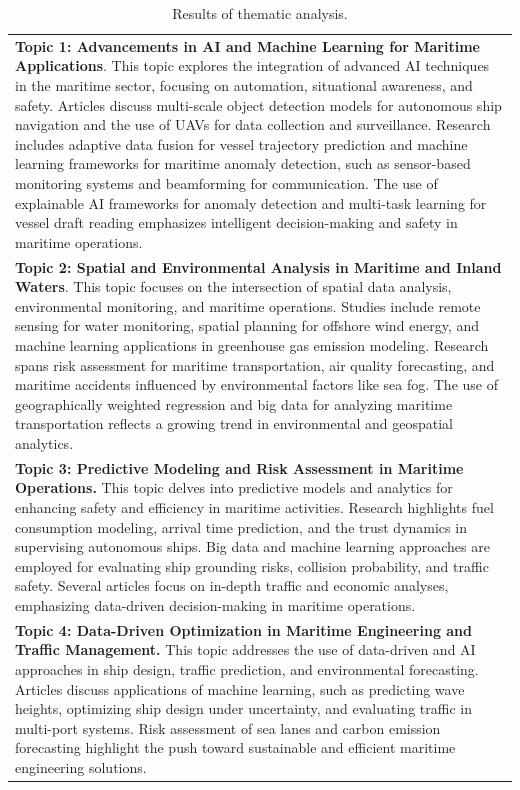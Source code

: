 \documentclass[a4paper, review, endfloat, authoryear]{elsarticle}
\begin{document}
	\begin{table}[h]
		\centering
		\caption{Results of thematic analysis.}
		\begin{tabular}{l}
			\hline
			\textbf{Topic 1: Advancements in AI and Machine Learning for Maritime Applications}. This topic explores the integration of advanced AI techniques in the maritime sector, focusing on automation, situational awareness, and safety. Articles discuss multi-scale object detection models for autonomous ship navigation and the use of UAVs for data collection and surveillance. Research includes adaptive data fusion for vessel trajectory prediction and machine learning frameworks for maritime anomaly detection, such as sensor-based monitoring systems and beamforming for communication. The use of explainable AI frameworks for anomaly detection and multi-task learning for vessel draft reading emphasizes intelligent decision-making and safety in maritime operations.\\			
			\textbf{Topic 2: Spatial and Environmental Analysis in Maritime and Inland Waters}. This topic focuses on the intersection of spatial data analysis, environmental monitoring, and maritime operations. Studies include remote sensing for water monitoring, spatial planning for offshore wind energy, and machine learning applications in greenhouse gas emission modeling. Research spans risk assessment for maritime transportation, air quality forecasting, and maritime accidents influenced by environmental factors like sea fog. The use of geographically weighted regression and big data for analyzing maritime transportation reflects a growing trend in environmental and geospatial analytics.\\			
			\textbf{Topic 3: Predictive Modeling and Risk Assessment in Maritime Operations.} This topic delves into predictive models and analytics for enhancing safety and efficiency in maritime activities. Research highlights fuel consumption modeling, arrival time prediction, and the trust dynamics in supervising autonomous ships. Big data and machine learning approaches are employed for evaluating ship grounding risks, collision probability, and traffic safety. Several articles focus on in-depth traffic and economic analyses, emphasizing data-driven decision-making in maritime operations.\\			
			\textbf{Topic 4: Data-Driven Optimization in Maritime Engineering and Traffic Management.} This topic addresses the use of data-driven and AI approaches in ship design, traffic prediction, and environmental forecasting. Articles discuss applications of machine learning, such as predicting wave heights, optimizing ship design under uncertainty, and evaluating traffic in multi-port systems. Risk assessment of sea lanes and carbon emission forecasting highlight the push toward sustainable and efficient maritime engineering solutions.\\			

\end{tabular}
\end{table}
\end{document}
